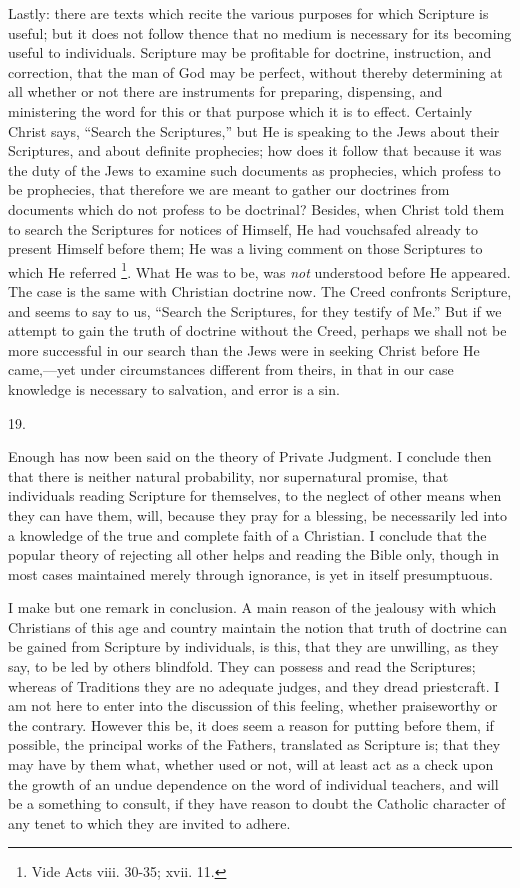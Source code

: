 Lastly: there are texts which recite the various purposes for which
Scripture is useful; but it does not follow thence that no medium is
necessary for its becoming useful to individuals. Scripture may be
profitable for doctrine, instruction, and correction, that the man of
God may be perfect, without thereby determining at all whether or not
there are instruments for preparing, dispensing, and ministering the
word for this or that purpose which it is to effect. Certainly Christ
says, ``Search the Scriptures,'' but He is speaking to the
Jews about their Scriptures, and about definite prophecies; how does
it follow that because it was the duty of the Jews to examine such
documents as prophecies, which profess to be prophecies, that
therefore we are meant to gather our doctrines from documents which do
not profess to be doctrinal? Besides, when Christ told them to search
the Scriptures for notices of Himself, He had vouchsafed already to
present Himself before them; He was a living comment on those
Scriptures to which He referred \footnote{Vide Acts viii. 30-35; xvii. 11.}. What He was to be, was \emph{not} understood before He appeared. The
case is the same with Christian doctrine now. The Creed confronts
Scripture, and seems to say to us, ``Search the Scriptures, for
they testify of Me.'' But if we attempt to gain the truth of
doctrine without the Creed, perhaps we shall not be more successful in
our search than the Jews were in seeking Christ before He came,—yet
under circumstances different from theirs, in that in our case
knowledge is necessary to salvation, and error is a sin.

19.

Enough has now been said on the theory of Private Judgment. I
conclude then that there is neither natural probability, nor
supernatural promise, that individuals reading Scripture for
themselves, to the neglect of other means when they can have them,
will, because they pray for a blessing, be necessarily led into a
knowledge of the true and complete faith of a Christian. I conclude
that the popular theory of rejecting all other helps and reading the
Bible only, though in most cases maintained merely through ignorance,
is yet in itself presumptuous.

I make but one remark in conclusion. A main reason of the jealousy
with which Christians of this age and country maintain the notion that
truth of doctrine can be gained from Scripture by individuals, is
this, that they are unwilling, as they say, to be led by others
blindfold. They can possess and read the Scriptures; whereas of
Traditions they are no adequate judges, and they dread priestcraft. I
am not here to enter into the discussion of this feeling, whether
praiseworthy or the contrary. However this be, it does seem a reason
for putting before them, if possible, the principal works of the
Fathers, translated as Scripture is; that they may have by them what,
whether used or not, will at least act as a check upon the growth of
an undue dependence on the word of individual teachers, and will be a
something to consult, if they have reason to doubt the Catholic
character of any tenet to which they are invited to adhere.

